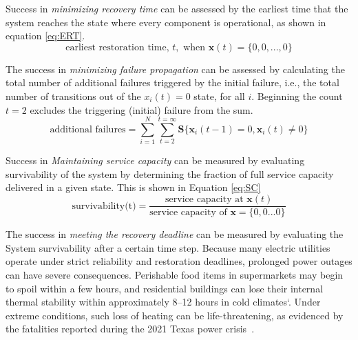 \documentclass[conference]{IEEEtran}
\begin{document}
Success in \emph{minimizing recovery time} can be assessed by the earliest time that the system reaches the state where every component is operational, as shown in equation \ref{eq:ERT}.
\begin{equation}
    \text{earliest restoration time, } t, \text{ when }
    \mathbf{x}(t) = \{0,0, ... , 0\}
    \label{eq:ERT}
\end{equation}

The success in \emph{minimizing failure propagation} can be assessed by calculating the total number of additional failures triggered by the initial failure, i.e., the total number of transitions out of the $x_i(t) = 0$ state, for all $i$. Beginning the count $t=2$ excludes the triggering (initial) failure from the sum.
\begin{equation}
    \text{additional failures} = \sum_{i=1}^{N}\sum_{t=2}^{t=\infty} \mathbf{S}\{\mathbf{x}_i(t-1) = 0, \mathbf{x}_i(t) \neq 0\} 
\end{equation}

Success in \emph{Maintaining service capacity} can be measured by evaluating survivability of the system by determining the fraction of full service capacity delivered in a given state. This is shown in Equation \ref{eq:SC}
\begin{equation}
    \text{survivability(t)} = \frac{\text{ service capacity at }\mathbf{x}(t)}{\text{service capacity of } \mathbf{x} = \{0,0 ...0\}}
    \label{eq:SC}
\end{equation}

The success in \emph{meeting the recovery deadline} can be measured by evaluating the System survivability after a certain time step. Because many electric utilities operate under strict reliability and restoration deadlines, prolonged power outages can have severe consequences. Perishable food items in supermarkets may begin to spoil within a few hours, and residential buildings can lose their internal thermal stability within approximately 8–12 hours in cold climates\cite{noauthor_how_nodate}`. Under extreme conditions, such loss of heating can be life-threatening, as evidenced by the fatalities reported during the 2021 Texas power crisis~\cite{svitek_texas_2022}.
\end{document}

